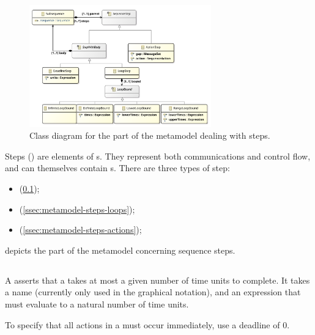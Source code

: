\begin{figure}[htb]
	\centering
	\includegraphics[width=0.7\textwidth]{diagrams/Steps}
	\caption{Class diagram for the part of the \langname{} metamodel dealing with steps.}
	\label{fig:metamodel-steps}
\end{figure}

\noindent
Steps (\msequencestep) are elements of
\msubsequence s.  They represent both communications and control flow, and
can themselves contain \msubsequence s.  There are three types of
step:

\begin{itemize}
\item \mdeadlinestep{} (\cref{ssec:metamodel-steps-deadlines});
\item \mloopstep{} (\cref{ssec:metamodel-steps-loops});
\item \mactionstep{} (\cref{ssec:metamodel-steps-actions});
\end{itemize}

 depicts the part of the metamodel concerning
sequence steps.

\subsection{\mdeadlinestep}\label{ssec:metamodel-steps-deadlines}

A \mdeadlinestep{} asserts that a \msubsequence{} takes at most
a given number of time units to complete.
It takes a name (currently only
used in the graphical notation), and an expression that must
evaluate to a natural number of time units.

\begin{remark}
To specify that all actions in a \msubsequence{} must occur
immediately, use a deadline of \(0\).
\end{remark}

